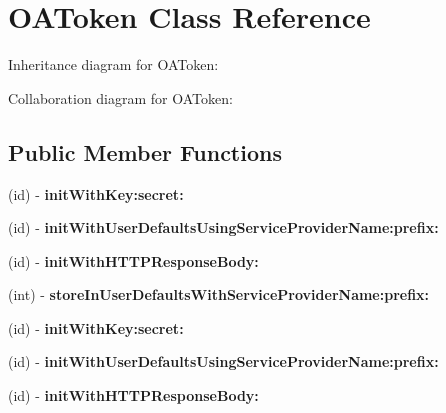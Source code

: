\hypertarget{interface_o_a_token}{
\section{\-O\-A\-Token \-Class \-Reference}
\label{interface_o_a_token}
}


\-Inheritance diagram for \-O\-A\-Token\-:


\-Collaboration diagram for \-O\-A\-Token\-:
\subsection*{\-Public \-Member \-Functions}
\begin{DoxyCompactItemize}
\item 
\hypertarget{interface_o_a_token_abb972888e0d6939fd1b48b0f74ccd997}{
(id) -\/ {\bfseries init\-With\-Key\-:secret\-:}}
\label{interface_o_a_token_abb972888e0d6939fd1b48b0f74ccd997}

\item 
\hypertarget{interface_o_a_token_a362a0c1e64ad62804ce8bdaf6f216bab}{
(id) -\/ {\bfseries init\-With\-User\-Defaults\-Using\-Service\-Provider\-Name\-:prefix\-:}}
\label{interface_o_a_token_a362a0c1e64ad62804ce8bdaf6f216bab}

\item 
\hypertarget{interface_o_a_token_a39bac69d4a054501c43bcbd0001706aa}{
(id) -\/ {\bfseries init\-With\-H\-T\-T\-P\-Response\-Body\-:}}
\label{interface_o_a_token_a39bac69d4a054501c43bcbd0001706aa}

\item 
\hypertarget{interface_o_a_token_a8de7b89373c093d7302598ee30cb2952}{
(int) -\/ {\bfseries store\-In\-User\-Defaults\-With\-Service\-Provider\-Name\-:prefix\-:}}
\label{interface_o_a_token_a8de7b89373c093d7302598ee30cb2952}

\item 
\hypertarget{interface_o_a_token_abb972888e0d6939fd1b48b0f74ccd997}{
(id) -\/ {\bfseries init\-With\-Key\-:secret\-:}}
\label{interface_o_a_token_abb972888e0d6939fd1b48b0f74ccd997}

\item 
\hypertarget{interface_o_a_token_a362a0c1e64ad62804ce8bdaf6f216bab}{
(id) -\/ {\bfseries init\-With\-User\-Defaults\-Using\-Service\-Provider\-Name\-:prefix\-:}}
\label{interface_o_a_token_a362a0c1e64ad62804ce8bdaf6f216bab}

\item 
\hypertarget{interface_o_a_token_a39bac69d4a054501c43bcbd0001706aa}{
(id) -\/ {\bfseries init\-With\-H\-T\-T\-P\-Response\-Body\-:}}
\label{interface_o_a_token_a39bac69d4a054501c43bcbd0001706aa}


\end{DoxyCompactItemize}

